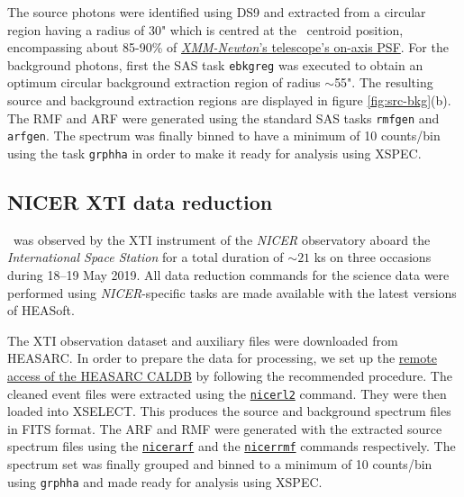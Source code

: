     	The source photons were identified using DS9 and extracted from a circular region having a radius of 30" which is centred at the \source\ centroid position, encompassing about 85-90\% of %
    	\href{https://xmm-tools.cosmos.esa.int/external/xmm_user_support/documentation/uhb/onaxisxraypsf.html}{\textit{XMM-Newton}'s telescope's on-axis PSF}. For the background photons, first the SAS task \texttt{ebkgreg} was executed to obtain an optimum circular background extraction region of radius $\sim$55". The resulting source and background extraction regions are displayed in figure \ref{fig:src-bkg}(b). The RMF and ARF were generated using the standard SAS tasks \texttt{rmfgen} and \texttt{arfgen}. The spectrum was finally binned to have a minimum of 10 counts/bin using the task \texttt{grphha} in order to make it ready for analysis using XSPEC.
    
    \subsection{NICER XTI data reduction}
    	\source\ was observed by the XTI instrument of the \textit{NICER} observatory aboard the \textit{International Space Station} for a total duration of $\sim 21$ ks on three occasions during 18--19 May 2019. All data reduction commands for the science data were performed using \textit{NICER}-specific tasks are made available with the latest versions of %
    	HEASoft.
    	
    	The XTI observation dataset and auxiliary files were downloaded from HEASARC. In order to prepare the data for processing, we set up the %
    	\href{https://heasarc.gsfc.nasa.gov/docs/heasarc/caldb/caldb_remote_access.html}{remote access of the HEASARC CALDB} by following the recommended %
    	procedure. The cleaned event files were extracted using the %
    	\href{https://heasarc.gsfc.nasa.gov/lheasoft/ftools/headas/nicerl2.html}{\texttt{nicerl2}} command. They were then loaded into XSELECT. This produces the source and background spectrum files in FITS format. The ARF and RMF were generated with the extracted source spectrum files using the %
    	\href{https://heasarc.gsfc.nasa.gov/lheasoft/ftools/headas/nicerarf.html}{\texttt{nicerarf}} and the %
    	\href{https://heasarc.gsfc.nasa.gov/lheasoft/ftools/headas/nicerrmf.html}{\texttt{nicerrmf}} commands respectively. The spectrum set was finally grouped and binned to a minimum of 10 counts/bin using \texttt{grphha} and made ready for analysis using XSPEC.
